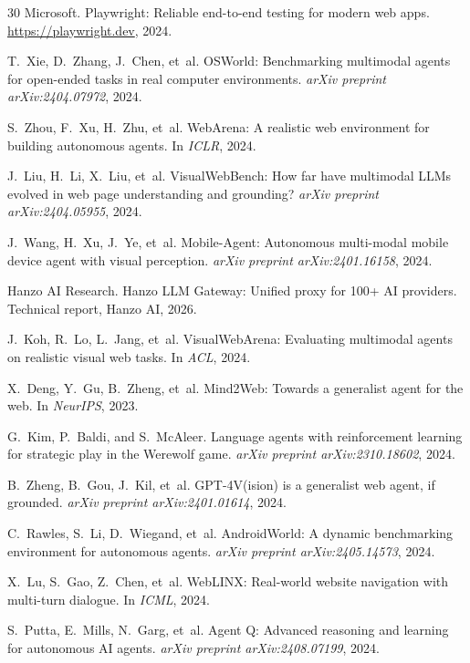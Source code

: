 \documentclass[11pt,twocolumn]{article}
\begin{document}
\begin{thebibliography}{30}
Microsoft.
\newblock Playwright: Reliable end-to-end testing for modern web apps.
\newblock \url{https://playwright.dev}, 2024.

T.~Xie, D.~Zhang, J.~Chen, et~al.
\newblock OSWorld: Benchmarking multimodal agents for open-ended tasks in real computer environments.
\newblock \emph{arXiv preprint arXiv:2404.07972}, 2024.

S.~Zhou, F.~Xu, H.~Zhu, et~al.
\newblock WebArena: A realistic web environment for building autonomous agents.
\newblock In \emph{ICLR}, 2024.

J.~Liu, H.~Li, X.~Liu, et~al.
\newblock VisualWebBench: How far have multimodal LLMs evolved in web page understanding and grounding?
\newblock \emph{arXiv preprint arXiv:2404.05955}, 2024.

J.~Wang, H.~Xu, J.~Ye, et~al.
\newblock Mobile-Agent: Autonomous multi-modal mobile device agent with visual perception.
\newblock \emph{arXiv preprint arXiv:2401.16158}, 2024.

Hanzo AI Research.
\newblock Hanzo LLM Gateway: Unified proxy for 100+ AI providers.
\newblock Technical report, Hanzo AI, 2026.

J.~Koh, R.~Lo, L.~Jang, et~al.
\newblock VisualWebArena: Evaluating multimodal agents on realistic visual web tasks.
\newblock In \emph{ACL}, 2024.

X.~Deng, Y.~Gu, B.~Zheng, et~al.
\newblock Mind2Web: Towards a generalist agent for the web.
\newblock In \emph{NeurIPS}, 2023.

G.~Kim, P.~Baldi, and S.~McAleer.
\newblock Language agents with reinforcement learning for strategic play in the Werewolf game.
\newblock \emph{arXiv preprint arXiv:2310.18602}, 2024.

B.~Zheng, B.~Gou, J.~Kil, et~al.
\newblock GPT-4V(ision) is a generalist web agent, if grounded.
\newblock \emph{arXiv preprint arXiv:2401.01614}, 2024.

C.~Rawles, S.~Li, D.~Wiegand, et~al.
\newblock AndroidWorld: A dynamic benchmarking environment for autonomous agents.
\newblock \emph{arXiv preprint arXiv:2405.14573}, 2024.

X.~Lu, S.~Gao, Z.~Chen, et~al.
\newblock WebLINX: Real-world website navigation with multi-turn dialogue.
\newblock In \emph{ICML}, 2024.

S.~Putta, E.~Mills, N.~Garg, et~al.
\newblock Agent Q: Advanced reasoning and learning for autonomous AI agents.
\newblock \emph{arXiv preprint arXiv:2408.07199}, 2024.

\end{thebibliography}
\end{document}
